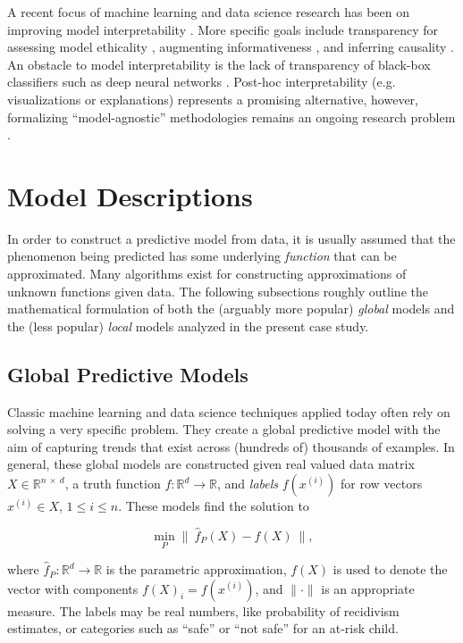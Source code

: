 \documentclass[conference]{IEEEtran}
\begin{document}
A recent focus of machine learning and data science research has been on improving model interpretability \cite{lipton2016mythos, juang2013data}. More specific goals include transparency for assessing model ethicality \cite{goodman2017european, herman2017data}, augmenting informativeness \cite{kim2015interactive, yang2018visually, wu2017interpretable}, and inferring causality \cite{syed2009enzyme}. An obstacle to model interpretability is the lack of transparency of black-box classifiers such as deep neural networks \cite{casillas2013interpretability, cortez2013using, krause2016interacting}.  Post-hoc interpretability \cite{lipton2016mythos} (e.g. visualizations or explanations) represents a promising alternative, however, formalizing  ``model-agnostic'' methodologies remains an ongoing research problem \cite{ribeiro2016should}.


\section{Model Descriptions}

In order to construct a predictive model from data, it is usually assumed that the phenomenon being predicted has some underlying \textit{function} that can be approximated. Many algorithms exist for constructing approximations of unknown functions given data. The following subsections roughly outline the mathematical formulation of both the (arguably more popular) \textit{global} models and the (less popular) \textit{local} models analyzed in the present case study.

\subsection{Global Predictive Models}
Classic machine learning and data science techniques applied today often rely on solving a very specific problem. They create a global predictive model with the aim of capturing trends that exist across (hundreds of) thousands of examples. In general, these global models are constructed given real valued data matrix $X \in \mathbb{R}^{n\ \times\ d}$, a truth function $f: \mathbb{R}^d \rightarrow \mathbb{R}$, and \textit{labels} $f(x^{(i)})$ for row vectors $x^{(i)} \in X$, $1 \leq i \leq n$. These models find the solution to

$$ \min_P \bigl\|\ \hat f_P(X) - f(X)\ \bigr\|, $$

\noindent where $\hat f_P: \mathbb{R}^d \rightarrow \mathbb{R}$ is the parametric approximation, $f(X)$ is used to denote the vector with components $f(X)_i = f(x^{(i)})$, and $\| \cdot \|$ is an appropriate measure. The labels may be real numbers, like probability of recidivism estimates, or categories such as ``safe'' or ``not safe'' for an at-risk child.
\end{document}
